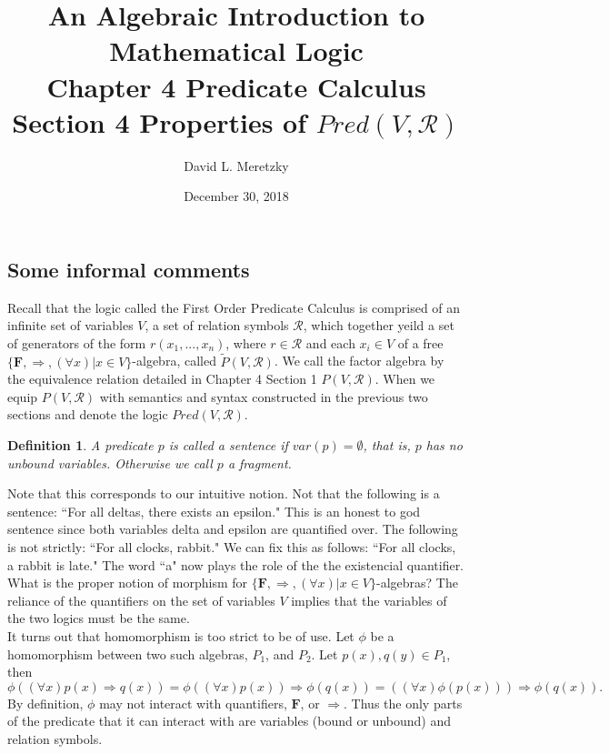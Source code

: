 \documentclass{article}
\title{ \vspace{-10ex} %
An Algebraic Introduction to Mathematical Logic\\
Chapter 4 Predicate Calculus \\
Section 4 Properties of $Pred(V, \mathscr{R})$ \\
}
\author{David L. Meretzky
}
\date{%
December 30, 2018
}
\theoremstyle{problemstyle}
\theoremstyle{lemmastyle}
\theoremstyle{theoremstyle}
\theoremstyle{problemstyle}
\newtheorem{definition}{Definition}
\theoremstyle{problemstyle}
\begin{document}
\maketitle

\subsection*{Some informal comments}

Recall that the logic called the First Order Predicate Calculus is comprised of an infinite set of variables $V$, a set of relation symbols $\mathscr{R}$, which together yeild a set of generators of the form $r(x_1,...,x_n)$, where $r \in \mathscr{R}$ and each $x_i \in V$ of a free $\{\textbf{F}, \Rightarrow, (\forall x) | x \in V\}$-algebra, called $\widetilde{P}(V,\mathscr{R})$. We call the factor algebra by the equivalence relation detailed in Chapter 4 Section 1 $P(V,\mathscr{R})$. When we equip $P(V,\mathscr{R})$ with semantics and syntax constructed in the previous two sections and denote the logic $Pred(V,\mathscr{R})$. 

\begin{definition}
A predicate $p$ is called a sentence if $var(p) = \emptyset$, that is, $p$ has no unbound variables. Otherwise we call $p$ a fragment. 
\end{definition}

Note that this corresponds to our intuitive notion. Not that the following is a sentence: ``For all deltas, there exists an epsilon." This is an honest to god sentence since both variables delta and epsilon are quantified over. The following is not strictly: ``For all clocks, rabbit." We can fix this as follows: ``For all clocks, a rabbit is late." The word ``a" now plays the role of the the existencial quantifier. \\

What is the proper notion of morphism for $\{\textbf{F}, \Rightarrow, (\forall x) | x \in V\}$-algebras? The reliance of the quantifiers on the set of variables $V$ implies that the variables of the two logics must be the same.\\

It turns out that homomorphism is too strict to be of use. Let $\phi$ be a homomorphism between two such algebras, $P_1$, and $P_2$. Let $p(x),q(y) \in P_1$, then $$\phi((\forall x)p(x) \Rightarrow q(x)) =\phi((\forall x)p(x)) \Rightarrow \phi(q(x)) =  ((\forall x)\phi(p(x))) \Rightarrow \phi(q(x)).$$ By definition, $\phi$ may not interact with quantifiers, $\textbf{F}$, or $\Rightarrow$. Thus the only parts of the predicate that it can interact with are variables (bound or unbound) and relation symbols.\\
\end{document}
